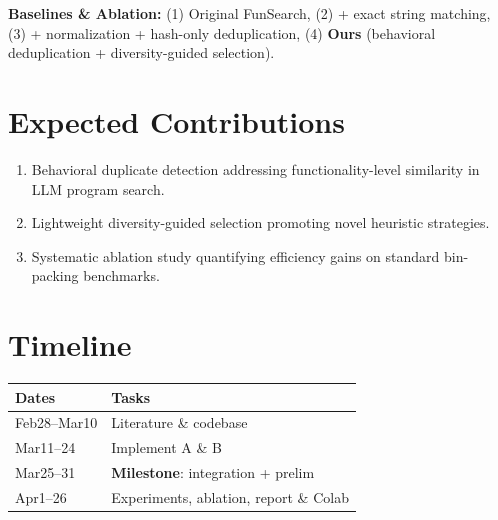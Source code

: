 \documentclass{article}
\begin{document}
\textbf{Baselines \& Ablation:} (1) Original FunSearch, (2) + exact string matching, (3) + normalization + hash-only deduplication, (4) \textbf{Ours} (behavioral deduplication + diversity-guided selection).

\section{Expected Contributions}
\begin{enumerate}\itemsep0pt
\item Behavioral duplicate detection addressing functionality-level similarity in LLM program search.
\item Lightweight diversity-guided selection promoting novel heuristic strategies.
\item Systematic ablation study quantifying efficiency gains on standard bin-packing benchmarks.
\end{enumerate}

\section{Timeline}
\begin{table}[h]
\centering\small
\begin{tabular}{@{}ll@{}}
\toprule
Dates & Tasks \\
\midrule
Feb28--Mar10 & Literature \& codebase \\
Mar11--24 & Implement A \& B \\
Mar25--31 & \textbf{Milestone}: integration + prelim \\
Apr1--26 & Experiments, ablation, report \& Colab \\
\bottomrule
\end{tabular}
\end{table}
\end{document}
